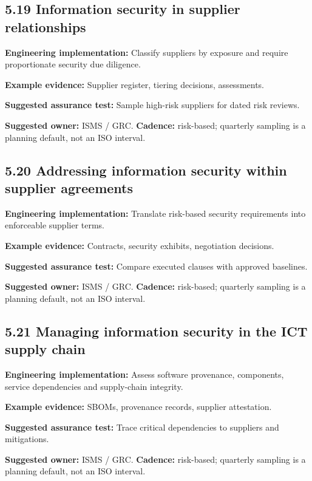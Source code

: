 \documentclass[11pt,letterpaper]{article}
\begin{document}
\subsection{5.19 Information security in supplier relationships}
\textbf{Engineering implementation:} Classify suppliers by exposure and require proportionate security due diligence.\par
\textbf{Example evidence:} Supplier register, tiering decisions, assessments.\par
\textbf{Suggested assurance test:} Sample high-risk suppliers for dated risk reviews.\par
\textbf{Suggested owner:} ISMS / GRC. \textbf{Cadence:} risk-based; quarterly sampling is a planning default, not an ISO interval.\par
{}
\subsection{5.20 Addressing information security within supplier agreements}
\textbf{Engineering implementation:} Translate risk-based security requirements into enforceable supplier terms.\par
\textbf{Example evidence:} Contracts, security exhibits, negotiation decisions.\par
\textbf{Suggested assurance test:} Compare executed clauses with approved baselines.\par
\textbf{Suggested owner:} ISMS / GRC. \textbf{Cadence:} risk-based; quarterly sampling is a planning default, not an ISO interval.\par
{}
\subsection{5.21 Managing information security in the ICT supply chain}
\textbf{Engineering implementation:} Assess software provenance, components, service dependencies and supply-chain integrity.\par
\textbf{Example evidence:} SBOMs, provenance records, supplier attestation.\par
\textbf{Suggested assurance test:} Trace critical dependencies to suppliers and mitigations.\par
\textbf{Suggested owner:} ISMS / GRC. \textbf{Cadence:} risk-based; quarterly sampling is a planning default, not an ISO interval.\par
{}
\end{document}

